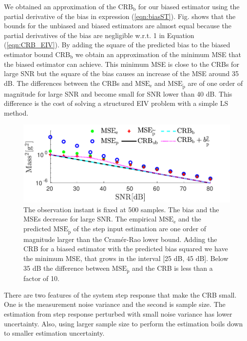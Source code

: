 We obtained an approximation of the $\mathrm{CRB}_{\mathrm{b}}$ for our biased estimator using the partial derivative of the bias in expression (\ref{eqn:biasST}).
Fig. \label{fig:MSE_CRB} shows that the bounds for the unbiased and biased estimators are almost equal because the partial derivatives of the bias are negligible w.r.t. 1 in Equation (\ref{eqn:CRB_EIV}).
By adding the square of the predicted bias to the biased estimator bound $\mathrm{CRB_{b}}$ we obtain an approximation of the minimum MSE that the biased estimator can achieve.
This minimum MSE is close to the CRBs for large SNR but the square of the bias causes an increase of the MSE around 35 dB.
The differences between the CRBs and $\mathrm{MSE}_\mathrm{e}$ and $\mathrm{MSE}_{\widetilde{\mathrm{p}}}$ are of one order of magnitude for large SNR and become small for SNR lower than 40 dB.
This difference is the cost of solving a structured EIV problem with a simple LS method.


\begin{figure}[!htb]
\centering
\includegraphics[width=1.0\columnwidth]{./ChapterExperimentalValidation/fig/Fig_3.pdf}
\caption{\label{fig:MSE_CRB} The observation instant is fixed at 500 samples.
The bias and the MSEs decrease for large SNR. 
The empirical $\mathrm{MSE_e}$ and the predicted $\mathrm{MSE}_{\widetilde{\mathrm{p}}}$ of the step input estimation are one order of magnitude larger than the Cram\'er-Rao lower bound.
Adding the CRB for a biased estimator with the predicted bias squared we have the minimum MSE, that grows in the interval [25 dB, 45 dB].
Below 35 dB the difference between $\mathrm{MSE}_{\widetilde{\mathrm{p}}}$ and the CRB is less than a factor of 10.}
\end{figure}

There are two features of the system step response that make the CRB small.
One is the measurement noise variance and the second is sample size.
The estimation from step response perturbed with small noise variance has lower uncertainty.
Also, using larger sample size to perform the estimation boils down to smaller estimation uncertainty.

